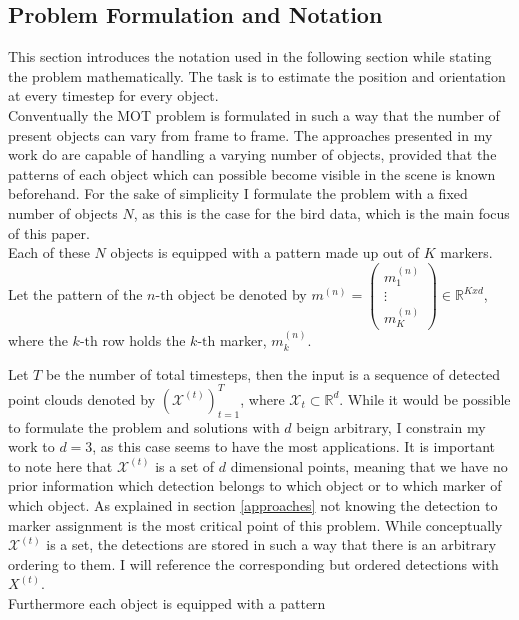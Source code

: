 \documentclass{article}
\begin{document}
\subsection{Problem Formulation and Notation}
\label{problem_def}

This section introduces the notation used in the following section while stating the problem mathematically. The task is to estimate the position and orientation at every timestep for every object. \\
Conventually the MOT problem is formulated in such a way that the number of present objects can vary from frame to frame. The approaches presented in my work do are capable of handling a varying number of objects, provided that the patterns of each object which can possible become visible in the scene is known beforehand. For the sake of simplicity I formulate the problem with a fixed number of objects $N$, as this is the case for the bird data, which is the main focus of this paper.\\
Each of these $N$ objects is equipped with a pattern made up out of $K$ markers. Let the pattern of the $n\text{-th}$ object be denoted by $m^{(n)} = 
\begin{pmatrix}
m^{(n)}_1 \\
\vdots \\
m^{(n)}_K
\end{pmatrix} \in \mathbb{R}^{Kxd}$, where the $k\text{-th}$ row holds the $k\text{-th}$ marker, $m^{(n)}_k$.

Let $T$ be the number of total timesteps, then the input is a sequence of detected point clouds denoted by $\left( \mathcal{X}^{(t)} \right)_{t=1}^T$, where $\mathcal{X}_t \subset \mathbb{R}^d$. 
While it would be possible to formulate the problem and solutions with $d$ beign arbitrary, I constrain my work to $d=3$, as this case seems to have the most applications. It is important to note here that $\mathcal{X}^{(t)}$ is a set of $d$ dimensional points, meaning that we have no prior information which detection belongs to which object or to which marker of which object. As explained in section \ref{approaches} not knowing the detection to marker assignment is the most critical point of this problem. While conceptually $\mathcal{X}^{(t)}$ is a set, the detections are stored in such a way that there is an arbitrary ordering to them. I will reference the corresponding but ordered detections with $X^{(t)}$. \\
Furthermore each object is equipped with a pattern
\end{document}
